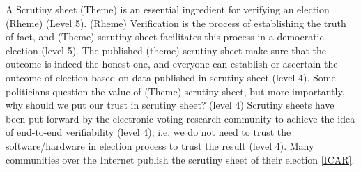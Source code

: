 A Scrutiny sheet (Theme) is an essential ingredient for verifying an election (Rheme) (Level 5). 
(Rheme) Verification 
is the process 
of establishing the truth of fact, and (Theme) scrutiny sheet facilitates this process in a democratic election 
(level 5). 
The published (theme) scrutiny sheet make sure that the outcome is indeed the honest one, and 
everyone can establish or ascertain the outcome of election based on data published in scrutiny
sheet (level 4). Some politicians question the value of (Theme) scrutiny sheet, but
more importantly, why should we put our trust in scrutiny sheet? (level 4) Scrutiny sheets have been put 
forward by the electronic voting research community to achieve the  
idea of end-to-end verifiability (level 4), i.e. we do not need to trust the 
software/hardware in election process to trust the result (level 4). 
Many communities over the Internet publish the scrutiny sheet of their 
election \ref{ICAR}.  


